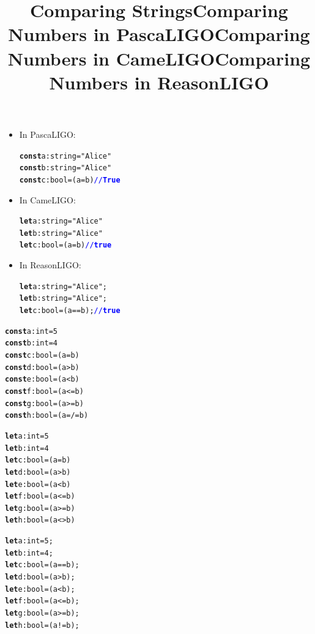 \documentclass[wide]{slides}
\newcommand{\Kconst}[0]{\textbf{const}\xspace}
\newcommand{\KTrue}[0]{\textbf{True}\xspace}
\newcommand{\Klet}[0]{\textbf{let}\xspace}
\newcommand{\Ktrue}[0]{\textbf{true}\xspace}
\newcommand{\com}[1]{\textcolor{blue}{{#1}}}
\begin{document}
\begin{slide}
  \title{Comparing Strings}

  \begin{itemize}

    \item In PascaLIGO:
      \begin{alltt}
\Kconst a : string = "Alice"
\Kconst b : string = "Alice"
\Kconst c : bool = (a = b) \com{// \KTrue}
      \end{alltt}

    \item In CameLIGO:
      \begin{alltt}
\Klet a : string = "Alice"
\Klet b : string = "Alice"
\Klet c : bool = (a = b) \com{// \Ktrue}
      \end{alltt}

    \item In ReasonLIGO:
      \begin{alltt}
\Klet a : string = "Alice";
\Klet b : string = "Alice";
\Klet c : bool = (a == b); \com{// \Ktrue}
      \end{alltt}

  \end{itemize}

\end{slide}

\begin{slide}
  \title{Comparing Numbers in PascaLIGO}

      \begin{alltt}
\Kconst a : int  = 5
\Kconst b : int  = 4
\Kconst c : bool = (a = b)
\Kconst d : bool = (a > b)
\Kconst e : bool = (a < b)
\Kconst f : bool = (a <= b)
\Kconst g : bool = (a >= b)
\Kconst h : bool = (a =/= b)
      \end{alltt}

\end{slide}

\begin{slide}
  \title{Comparing Numbers in CameLIGO}

      \begin{alltt}
\Klet a : int  = 5
\Klet b : int  = 4
\Klet c : bool = (a = b)
\Klet d : bool = (a > b)
\Klet e : bool = (a < b)
\Klet f : bool = (a <= b)
\Klet g : bool = (a >= b)
\Klet h : bool = (a <> b)
      \end{alltt}

\end{slide}

\begin{slide}
  \title{Comparing Numbers in ReasonLIGO}

      \begin{alltt}
\Klet a : int  = 5;
\Klet b : int  = 4;
\Klet c : bool = (a == b);
\Klet d : bool = (a > b);
\Klet e : bool = (a < b);
\Klet f : bool = (a <= b);
\Klet g : bool = (a >= b);
\Klet h : bool = (a != b);
      \end{alltt}

\end{slide}
\end{document}
